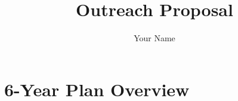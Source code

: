 \documentclass{awesome-proposal}
\title{Outreach Proposal}
\author{Your Name}
\date{}
\begin{document}
\maketitle %

\newpage
\section*{6-Year Plan Overview}


\newpage

\newpage

\newpage



\end{document}
